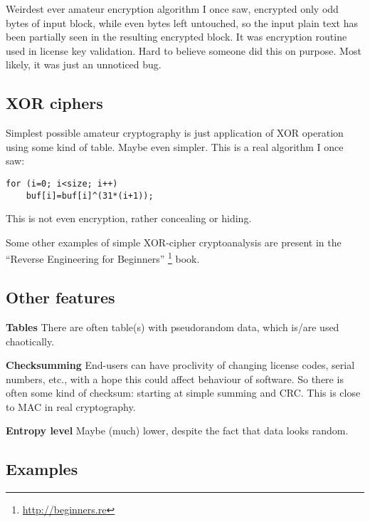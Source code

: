 Weirdest ever amateur encryption algorithm I once saw, encrypted only odd bytes of input block, while even bytes
left untouched, so the input plain text has been partially seen in the resulting encrypted block.
It was encryption routine used in license key validation.
Hard to believe someone did this on purpose.
Most likely, it was just an unnoticed bug.

\subsection{XOR ciphers}

Simplest possible amateur cryptography is just application of XOR operation using some kind of table.
Maybe even simpler. This is a real algorithm I once saw:

\begin{lstlisting}
for (i=0; i<size; i++)
    buf[i]=buf[i]^(31*(i+1));
\end{lstlisting}

This is not even encryption, rather concealing or hiding.

Some other examples of simple XOR-cipher cryptoanalysis are present in the ``Reverse Engineering for Beginners''
\footnote{\url{http://beginners.re}} book.

\subsection{Other features}

\textbf{Tables} There are often table(s) with pseudorandom data, which is/are used chaotically.

\textbf{Checksumming} End-users can have proclivity of changing license codes, serial numbers, etc., with a hope
this could affect behaviour of software.
So there is often some kind of checksum: starting at simple summing and \ac{CRC}.
This is close to \ac{MAC} in real cryptography.

\textbf{Entropy level} Maybe (much) lower, despite the fact that data looks random.

\subsection{Examples}

